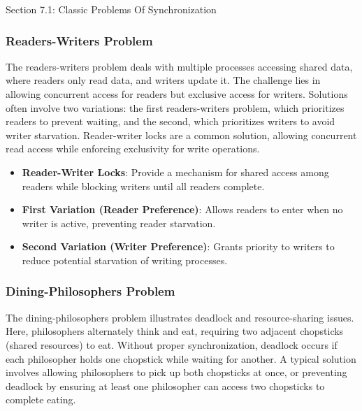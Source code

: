 \begin{notes}{Section 7.1: Classic Problems Of Synchronization}
\begin{highlight}
    \end{highlight}
    
    \subsubsection*{Readers-Writers Problem}
    
    The readers-writers problem deals with multiple processes accessing shared data, where readers only read data, and writers update it. The challenge lies in allowing concurrent access for readers 
    but exclusive access for writers. Solutions often involve two variations: the first readers-writers problem, which prioritizes readers to prevent waiting, and the second, which prioritizes writers 
    to avoid writer starvation. Reader-writer locks are a common solution, allowing concurrent read access while enforcing exclusivity for write operations.
    
    \begin{highlight}
    
        \begin{itemize}
            \item \textbf{Reader-Writer Locks}: Provide a mechanism for shared access among readers while blocking writers until all readers complete.
            \item \textbf{First Variation (Reader Preference)}: Allows readers to enter when no writer is active, preventing reader starvation.
            \item \textbf{Second Variation (Writer Preference)}: Grants priority to writers to reduce potential starvation of writing processes.
        \end{itemize}
    
    \end{highlight}
    
    \subsubsection*{Dining-Philosophers Problem}
    
    The dining-philosophers problem illustrates deadlock and resource-sharing issues. Here, philosophers alternately think and eat, requiring two adjacent chopsticks (shared resources) to eat. Without 
    proper synchronization, deadlock occurs if each philosopher holds one chopstick while waiting for another. A typical solution involves allowing philosophers to pick up both chopsticks at once, or 
    preventing deadlock by ensuring at least one philosopher can access two chopsticks to complete eating.
    

\end{notes}
